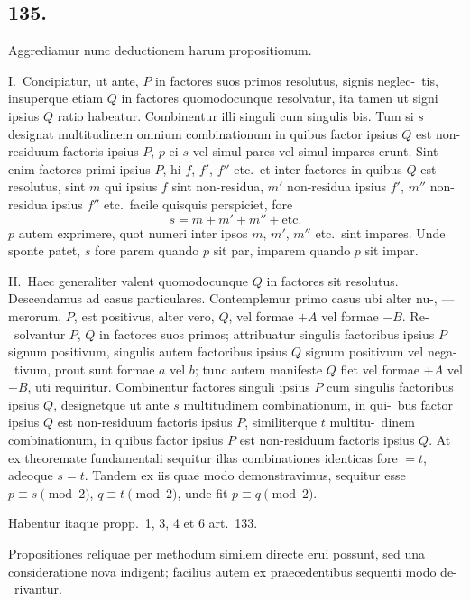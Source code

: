 \documentclass[12pt,a4paper]{article}
\theoremstyle{plain}
\theoremstyle{definition}
\theoremstyle{remark}
\begin{document}
\subsection*{135.}

Aggrediamur nunc deductionem harum propositionum.

I.\ Concipiatur, ut ante, $P$ in factores suos primos resolutus, signis neglec-\ tis,
insuperque etiam $Q$ in factores quomodocunque resolvatur, ita tamen ut signi
ipsius $Q$ ratio habeatur. Combinentur illi singuli cum singulis bis. Tum si $s$
designat multitudinem omnium combinationum in quibus factor ipsius $Q$ est
non-residuum factoris ipsius $P$, $p$ ei $s$ vel simul pares vel simul impares erunt.
Sint enim factores primi ipsius $P$, hi $f$, $f'$, $f''$ etc.\ et inter factores in quibus $Q$
est resolutus, sint $m$ qui ipsius $f$ sint non-residua, $m'$ non-residua ipsius $f'$, $m''$
non-residua ipsius $f''$ etc.\ facile quisquis perspiciet, fore
\[
s = m + m' + m'' + \text{etc.}
\]
$p$ autem exprimere, quot numeri inter ipsos $m$, $m'$, $m''$ etc.\ sint impares. Unde
sponte patet, $s$ fore parem quando $p$ sit par, imparem quando $p$ sit impar.

II.\ Haec generaliter valent quomodocunque $Q$ in factores sit resolutus.
Descendamus ad casus particulares. Contemplemur primo casus ubi alter nu-, --- merorum, $P$, est positivus, alter vero, $Q$, vel formae $+A$ vel formae $-B$. Re-\ solvantur $P$, $Q$ in factores suos primos; attribuatur singulis factoribus ipsius $P$
signum positivum, singulis autem factoribus ipsius $Q$ signum positivum vel nega-\ tivum, prout sunt formae $a$ vel $b$; tunc autem manifeste $Q$ fiet vel formae $+A$
vel $-B$, uti requiritur. Combinentur factores singuli ipsius $P$ cum singulis
factoribus ipsius $Q$, designetque ut ante $s$ multitudinem combinationum, in qui-\ bus factor ipsius $Q$ est non-residuum factoris ipsius $P$, similiterque $t$ multitu-\ dinem combinationum, in quibus factor ipsius $P$ est non-residuum factoris ipsius
$Q$. At ex theoremate fundamentali sequitur illas combinationes identicas fore
$= t$, adeoque $s = t$. Tandem ex iis quae modo demonstravimus, sequitur esse
$p \equiv s \pmod{2}$, $q \equiv t \pmod{2}$, unde fit $p \equiv q \pmod{2}$.

Habentur itaque propp.~1, 3, 4 et 6 art.~133.

Propositiones reliquae per methodum similem directe erui possunt, sed una
consideratione nova indigent; facilius autem ex praecedentibus sequenti modo de-\ rivantur.
\end{document}
